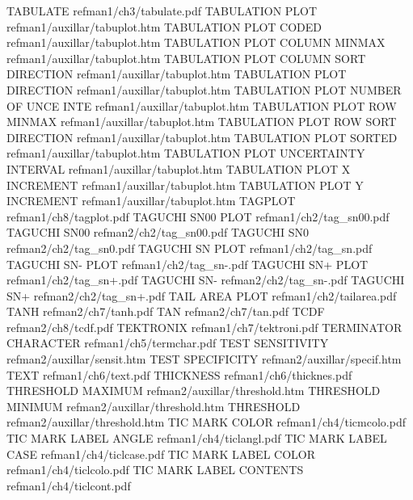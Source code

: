 TABULATE                                refman1/ch3/tabulate.pdf
TABULATION PLOT                         refman1/auxillar/tabuplot.htm
TABULATION PLOT CODED                   refman1/auxillar/tabuplot.htm
TABULATION PLOT COLUMN MINMAX           refman1/auxillar/tabuplot.htm
TABULATION PLOT COLUMN SORT DIRECTION   refman1/auxillar/tabuplot.htm
TABULATION PLOT DIRECTION               refman1/auxillar/tabuplot.htm
TABULATION PLOT NUMBER OF UNCE INTE     refman1/auxillar/tabuplot.htm
TABULATION PLOT ROW MINMAX              refman1/auxillar/tabuplot.htm
TABULATION PLOT ROW SORT DIRECTION      refman1/auxillar/tabuplot.htm
TABULATION PLOT SORTED                  refman1/auxillar/tabuplot.htm
TABULATION PLOT UNCERTAINTY INTERVAL    refman1/auxillar/tabuplot.htm
TABULATION PLOT X INCREMENT             refman1/auxillar/tabuplot.htm
TABULATION PLOT Y INCREMENT             refman1/auxillar/tabuplot.htm
TAGPLOT                                 refman1/ch8/tagplot.pdf
TAGUCHI SN00 PLOT                       refman1/ch2/tag_sn00.pdf
TAGUCHI SN00                            refman2/ch2/tag_sn00.pdf
TAGUCHI SN0                             refman2/ch2/tag_sn0.pdf
TAGUCHI SN PLOT                         refman1/ch2/tag_sn.pdf
TAGUCHI SN- PLOT                        refman1/ch2/tag_sn-.pdf
TAGUCHI SN+ PLOT                        refman1/ch2/tag_sn+.pdf
TAGUCHI SN-                             refman2/ch2/tag_sn-.pdf
TAGUCHI SN+                             refman2/ch2/tag_sn+.pdf
TAIL AREA PLOT                          refman1/ch2/tailarea.pdf
TANH                                    refman2/ch7/tanh.pdf
TAN                                     refman2/ch7/tan.pdf
TCDF                                    refman2/ch8/tcdf.pdf
TEKTRONIX                               refman1/ch7/tektroni.pdf
TERMINATOR CHARACTER                    refman1/ch5/termchar.pdf
TEST SENSITIVITY                        refman2/auxillar/sensit.htm
TEST SPECIFICITY                        refman2/auxillar/specif.htm
TEXT                                    refman1/ch6/text.pdf
THICKNESS                               refman1/ch6/thicknes.pdf
THRESHOLD MAXIMUM                       refman2/auxillar/threshold.htm
THRESHOLD MINIMUM                       refman2/auxillar/threshold.htm
THRESHOLD                               refman2/auxillar/threshold.htm
TIC MARK COLOR                          refman1/ch4/ticmcolo.pdf
TIC MARK LABEL ANGLE                    refman1/ch4/ticlangl.pdf
TIC MARK LABEL CASE                     refman1/ch4/ticlcase.pdf
TIC MARK LABEL COLOR                    refman1/ch4/ticlcolo.pdf
TIC MARK LABEL CONTENTS                 refman1/ch4/ticlcont.pdf
